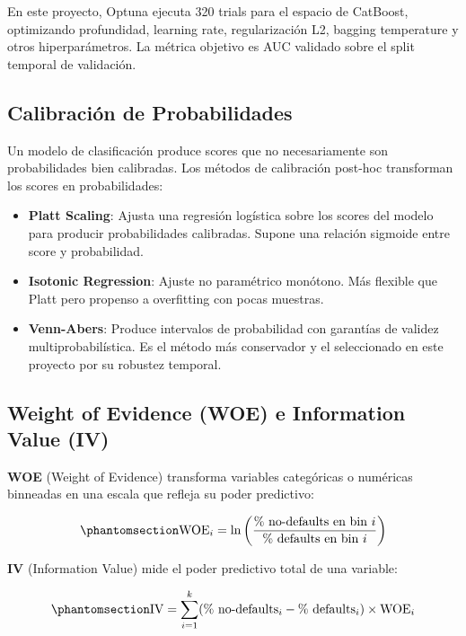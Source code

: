\documentclass[
  spanish,
  11pt,
  letterpaper,
]{scrbook}
\providecommand{\tightlist}{%
  \setlength{\itemsep}{0pt}\setlength{\parskip}{0pt}}
\theoremstyle{plain}
\theoremstyle{remark}
\begin{document}
En este proyecto, Optuna ejecuta 320 trials para el espacio de CatBoost,
optimizando profundidad, learning rate, regularización L2, bagging
temperature y otros hiperparámetros. La métrica objetivo es AUC validado
sobre el split temporal de validación.

\subsection{Calibración de
Probabilidades}\label{calibraciuxf3n-de-probabilidades}

Un modelo de clasificación produce scores que no necesariamente son
probabilidades bien calibradas. Los métodos de calibración post-hoc
transforman los scores en probabilidades:

\begin{itemize}
\tightlist
\item
  \textbf{Platt Scaling}: Ajusta una regresión logística sobre los
  scores del modelo para producir probabilidades calibradas. Supone una
  relación sigmoide entre score y probabilidad.
\item
  \textbf{Isotonic Regression}: Ajuste no paramétrico monótono. Más
  flexible que Platt pero propenso a overfitting con pocas muestras.
\item
  \textbf{Venn-Abers}: Produce intervalos de probabilidad con garantías
  de validez multiprobabilística. Es el método más conservador y el
  seleccionado en este proyecto por su robustez temporal.
\end{itemize}

\subsection{Weight of Evidence (WOE) e Information Value
(IV)}\label{weight-of-evidence-woe-e-information-value-iv}

\textbf{WOE} (Weight of Evidence) transforma variables categóricas o
numéricas binneadas en una escala que refleja su poder predictivo:

\begin{equation}\protect\phantomsection\label{eq-woe}{
\text{WOE}_i = \ln \left( \frac{\% \text{ no-defaults en bin } i}{\% \text{ defaults en bin } i} \right)
}\end{equation}

\textbf{IV} (Information Value) mide el poder predictivo total de una
variable:

\begin{equation}\protect\phantomsection\label{eq-iv}{
\text{IV} = \sum_{i=1}^{k} (\% \text{ no-defaults}_i - \% \text{ defaults}_i) \times \text{WOE}_i
}\end{equation}
\end{document}

